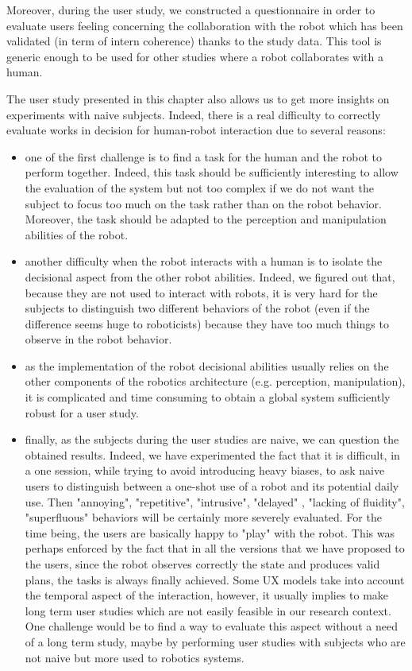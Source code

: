 \documentclass[english,a4paper,11pt,twoside]{StyleThese}
\begin{document}
Moreover, during the user study, we constructed a questionnaire in order to evaluate users feeling concerning the collaboration with the robot which has been validated (in term of intern coherence) thanks to the study data. This tool is generic enough to be used for other studies where a robot collaborates with a human.

The user study presented in this chapter also allows us to get more insights on experiments with naive subjects. Indeed, there is a real difficulty to correctly evaluate works in decision for human-robot interaction due to several reasons:
\begin{itemize}
\item one of the first challenge is to find a task for the human and the robot to perform together. Indeed, this task should be sufficiently interesting to allow the evaluation of the system but not too complex if we do not want the subject to focus too much on the task rather than on the robot behavior. Moreover, the task should be adapted to the perception and manipulation abilities of the robot.
\item another difficulty when the robot interacts with a human is to isolate the decisional aspect from the other robot abilities. Indeed, we figured out that, because they are not used to interact with robots, it is very hard for the subjects to distinguish two different behaviors of the robot (even if the difference seems huge to roboticists) because they have too much things to observe in the robot behavior.
\item as the implementation of the robot decisional abilities usually relies on the other components of the robotics architecture (e.g. perception, manipulation), it is complicated and time consuming to obtain a global system sufficiently robust for a user study.
\item finally, as the subjects during the user studies are naive, we can question the obtained results. 
Indeed, we have experimented the fact that it is difficult, in a one session, while trying to avoid introducing heavy biases, to ask naive users to distinguish between a one-shot use of a robot and its potential daily use.  Then "annoying", "repetitive", "intrusive", "delayed" , "lacking of fluidity", "superfluous" behaviors will be certainly more severely evaluated. For the time being, the users are basically happy to "play" with the robot. This was perhaps enforced by the fact that in all the versions that we have proposed to the users, since the robot observes correctly the state and produces valid plans, the tasks is always finally achieved. Some UX models take into account the temporal aspect of the interaction\cite{kim2015user}, however, it usually implies to make long term user studies which are not easily feasible in our research context. One challenge would be to find a way to evaluate this aspect without a need of a long term study, maybe by performing user studies with subjects who are not naive but more used to robotics systems.
\end{itemize}

\ifdefined{}
\else


\end{document}
